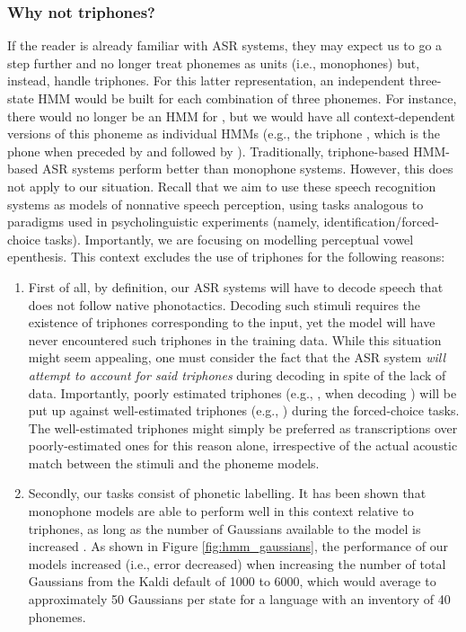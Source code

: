 \subsubsection{Why not triphones?}
If the reader is already familiar with ASR systems, they may expect us to go a step further and no longer treat phonemes as units (i.e., monophones) but, instead, handle triphones. For this latter representation, an independent three-state HMM would be built for each combination of three phonemes. For instance, there would no longer be an HMM for , but we would have all context-dependent versions of this phoneme as individual HMMs (e.g., the triphone , which is the phone  when preceded by  and followed by ).
Traditionally, triphone-based HMM-based ASR systems perform better than monophone systems. However, this does not apply to our situation. Recall that we aim to use these speech recognition systems as models of nonnative speech perception, using tasks analogous to paradigms used in psycholinguistic experiments (namely, identification/forced-choice tasks). Importantly, we are focusing on modelling perceptual vowel epenthesis. This context excludes the use of triphones for the following reasons:
\begin{enumerate}
\item First of all, by definition, our ASR systems will have to decode speech that does not follow native phonotactics. Decoding such stimuli requires the existence of triphones corresponding to the input, yet the model will have never encountered such triphones in the training data. While this situation might seem appealing, one must consider the fact that the ASR system \textit{will attempt to account for said triphones} during decoding in spite of the lack of data. Importantly, poorly estimated triphones (e.g., , when decoding ) will be put up against well-estimated triphones (e.g., ) during the forced-choice tasks. The well-estimated triphones might simply be preferred as transcriptions over poorly-estimated ones for this reason alone, irrespective of the actual acoustic match between the stimuli and the phoneme models.
  \item Secondly, our tasks consist of phonetic labelling. It has been shown that monophone models are able to perform well in this context relative to triphones, as long as the number of Gaussians available to the model is increased {\color{red}\cite{saraclar2001}}. As shown in Figure \ref{fig:hmm_gaussians}, the performance of our models increased (i.e., error decreased) when increasing the number of total Gaussians from the Kaldi default of 1000 to 6000, which would average to approximately 50 Gaussians per state for a language with an inventory of 40 phonemes.   
  \end{enumerate}
  
